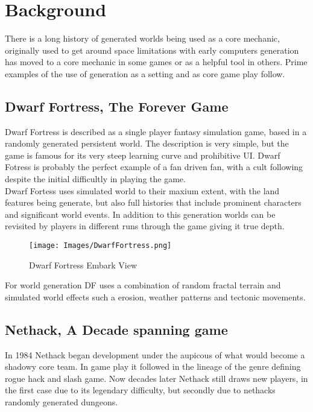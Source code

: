\section{Background}
There is a long history of generated worlds being used as a core mechanic, 
originally used to get around space limitations with early computers generation
has moved to a core mechanic in some games or as a helpful tool in others. Prime
examples of the use of generation as a setting and as core game play follow.\\

\subsection*{Dwarf Fortress, The Forever Game}
Dwarf Fortress is described as a single player fantasy simulation game, based in a 
randomly generated persistent world. The description is very simple, but the game is
famous for its very steep learning curve and prohibitive UI. Dwarf Fotress is 
probably the perfect example of a fan driven fan, with a cult following despite the
initial difficultly in playing the game.\\

Dwarf Fortess uses simulated world to their maxium extent, with the land features 
being generate, but also full histories that include prominent characters and 
significant world events. In addition to this generation worlds can be revisited by
players in different runs through the game giving it true depth.\\

\begin{figure}[h!]
  \texttt{[image: Images/DwarfFortress.png]}
  \caption{Dwarf Fortress Embark View}
\end{figure}

For world generation DF uses a combination of random fractal terrain and simulated
world effects such a erosion, weather patterns and tectonic movements.\\

\subsection*{Nethack, A Decade spanning game}
In 1984 Nethack began development under the aupicous of what would become a 
shadowy core team. In game play it followed in the lineage of the genre defining
rogue hack and slash game. Now decades later Nethack still draws new players,
in the first case due to its legendary difficulty, but secondly due to nethacks 
randomly generated dungeons.\\ 

